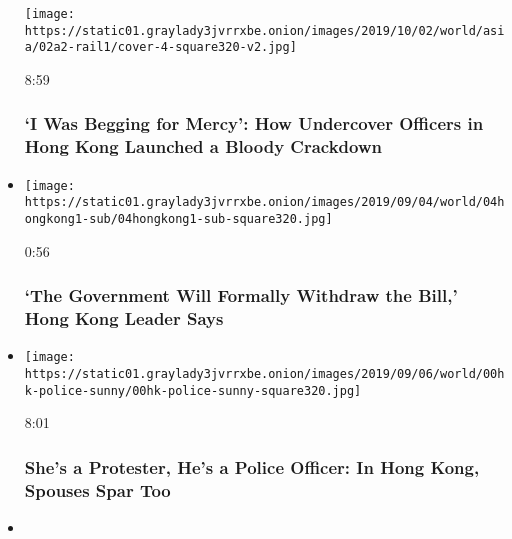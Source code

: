 \begin{itemize}
  \texttt{[image: https://static01.graylady3jvrrxbe.onion/images/2019/10/02/world/asia/02a2-rail1/cover-4-square320-v2.jpg]}

  8:59

  \hypertarget{i-was-begging-for-mercy-how-undercover-officers-in-hong-kong-launched-a-bloody-crackdown}{%
  \subsubsection{`I Was Begging for Mercy': How Undercover Officers in
  Hong Kong Launched a Bloody
  Crackdown}\label{i-was-begging-for-mercy-how-undercover-officers-in-hong-kong-launched-a-bloody-crackdown}}
\item
  \href{https://www.nytimes3xbfgragh.onion/video/world/asia/100000006696918/extradition-bill-hong-kong.html?action=click\&module=video-series-bar\&region=header\&pgtype=Article\&playlistId=video/hk-protest}{}

  \texttt{[image: https://static01.graylady3jvrrxbe.onion/images/2019/09/04/world/04hongkong1-sub/04hongkong1-sub-square320.jpg]}

  0:56

  \hypertarget{the-government-will-formally-withdraw-the-bill-hong-kong-leader-says}{%
  \subsubsection{`The Government Will Formally Withdraw the Bill,' Hong
  Kong Leader
  Says}\label{the-government-will-formally-withdraw-the-bill-hong-kong-leader-says}}
\item
  \href{https://www.nytimes3xbfgragh.onion/video/world/asia/100000006682566/shes-a-protester-hes-a-police-officer-in-hong-kong-spouses-spar-too.html?action=click\&module=video-series-bar\&region=header\&pgtype=Article\&playlistId=video/hk-protest}{}

  \texttt{[image: https://static01.graylady3jvrrxbe.onion/images/2019/09/06/world/00hk-police-sunny/00hk-police-sunny-square320.jpg]}

  8:01

  \hypertarget{shes-a-protester-hes-a-police-officer-in-hong-kong-spouses-spar-too}{%
  \subsubsection{She's a Protester, He's a Police Officer: In Hong Kong,
  Spouses Spar
  Too}\label{shes-a-protester-hes-a-police-officer-in-hong-kong-spouses-spar-too}}
\item
  \href{https://www.nytimes3xbfgragh.onion/video/world/asia/100000006691745/hong-kong-protest.html?action=click\&module=video-series-bar\&region=header\&pgtype=Article\&playlistId=video/hk-protest}{}


\end{itemize}
